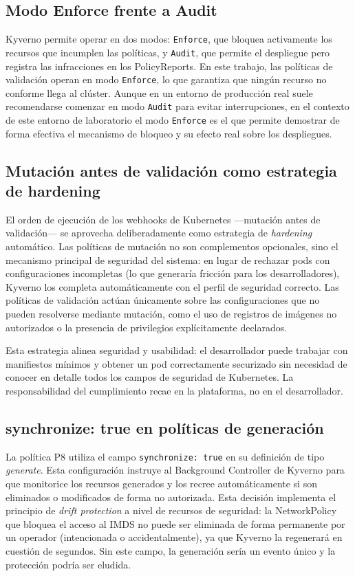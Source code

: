 \subsection{Modo Enforce frente a Audit}

Kyverno permite operar en dos modos: \texttt{Enforce}, que bloquea activamente los recursos que incumplen las políticas, y \texttt{Audit}, que permite el despliegue pero registra las infracciones en los PolicyReports. En este trabajo, las políticas de validación operan en modo \texttt{Enforce}, lo que garantiza que ningún recurso no conforme llega al clúster. Aunque en un entorno de producción real suele recomendarse comenzar en modo \texttt{Audit} para evitar interrupciones, en el contexto de este entorno de laboratorio el modo \texttt{Enforce} es el que permite demostrar de forma efectiva el mecanismo de bloqueo y su efecto real sobre los despliegues.

\subsection{Mutación antes de validación como estrategia de hardening}

El orden de ejecución de los webhooks de Kubernetes —mutación antes de validación— se aprovecha deliberadamente como estrategia de \textit{hardening} automático. Las políticas de mutación no son complementos opcionales, sino el mecanismo principal de seguridad del sistema: en lugar de rechazar pods con configuraciones incompletas (lo que generaría fricción para los desarrolladores), Kyverno los completa automáticamente con el perfil de seguridad correcto. Las políticas de validación actúan únicamente sobre las configuraciones que no pueden resolverse mediante mutación, como el uso de registros de imágenes no autorizados o la presencia de privilegios explícitamente declarados.

Esta estrategia alinea seguridad y usabilidad: el desarrollador puede trabajar con manifiestos mínimos y obtener un pod correctamente securizado sin necesidad de conocer en detalle todos los campos de seguridad de Kubernetes. La responsabilidad del cumplimiento recae en la plataforma, no en el desarrollador.

\subsection{synchronize: true en políticas de generación}

La política P8 utiliza el campo \texttt{synchronize: true} en su definición de tipo \textit{generate}. Esta configuración instruye al Background Controller de Kyverno para que monitorice los recursos generados y los recree automáticamente si son eliminados o modificados de forma no autorizada. Esta decisión implementa el principio de \textit{drift protection} a nivel de recursos de seguridad: la NetworkPolicy que bloquea el acceso al IMDS no puede ser eliminada de forma permanente por un operador (intencionada o accidentalmente), ya que Kyverno la regenerará en cuestión de segundos. Sin este campo, la generación sería un evento único y la protección podría ser eludida.

